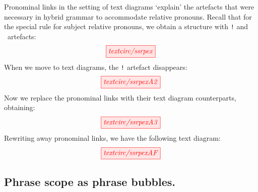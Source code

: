 \begin{example}
Pronominal links in the setting of text diagrams `explain' the artefacts that were necessary in hybrid grammar to accommodate relative pronouns. Recall that for the special rule for subject relative pronouns, we obtain a structure with \texttt{!} and \textvisiblespace \ artefacts:
\[
\tikzfig{textcirc/ssrpex}
\]
When we move to text diagrams, the \texttt{!} artefact disappears:
\[
\tikzfig{textcirc/ssrpexA2}
\]
Now we replace the pronominal links with their text diagram counterparts, obtaining:
\[
\tikzfig{textcirc/ssrpexA3}
\]
Rewriting away pronominal links, we have the following text diagram:
\[
\tikzfig{textcirc/ssrpexAF}
\]

\end{example}



\subsection{Phrase scope as phrase bubbles.}  

